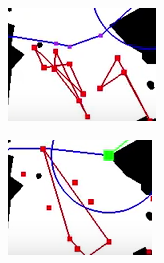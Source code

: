 \documentclass[]{article}
\begin{document}
\begin{figure}[h]
\begin{subfigure}{0.19\textwidth}
    \includegraphics[width=\linewidth]{pics/cluster3.png}
    \caption{}
\end{subfigure}
\begin{subfigure}{0.19\textwidth}
    \includegraphics[width=\linewidth]{pics/cluster4.png}
    \caption{}
\end{subfigure}
\begin{subfigure}{0.19\textwidth}

\end{subfigure}
\end{figure}
\end{document}
